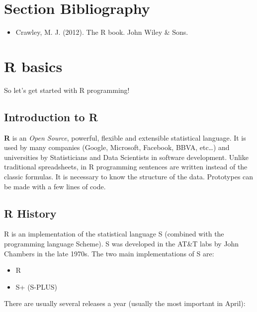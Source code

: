 \documentclass[
]{book}
\providecommand{\tightlist}{%
  \setlength{\itemsep}{0pt}\setlength{\parskip}{0pt}}
\begin{document}
\hypertarget{section-bibliography}{%
\section{Section Bibliography}\label{section-bibliography}}

\begin{itemize}
\tightlist
\item
  Crawley, M. J. (2012). The R book. John Wiley \& Sons.
\end{itemize}

\hypertarget{r-basics}{%
\section{R basics}\label{r-basics}}

So let's get started with R programming!

\hypertarget{introduction-to-r}{%
\subsection{Introduction to R}\label{introduction-to-r}}

\textbf{R} is an \emph{Open Source}, powerful, flexible and extensible statistical language. It is used by many companies (Google, Microsoft, Facebook, BBVA, etc\ldots) and universities by Statisticians and Data Scientists in software development. Unlike traditional spreadsheets, in R programming sentences are written instead of the classic formulas. It is necessary to know the structure of the data. Prototypes can be made with a few lines of code.

\hypertarget{r-history}{%
\subsection{R History}\label{r-history}}

R is an implementation of the statistical language S (combined with the programming language Scheme). S was developed in the AT\&T labs by John Chambers in the late 1970s. The two main implementations of S are:

\begin{itemize}
\tightlist
\item
  R
\item
  S+ (S-PLUS)
\end{itemize}

There are usually several releases a year (usually the most important in April):
\end{document}
